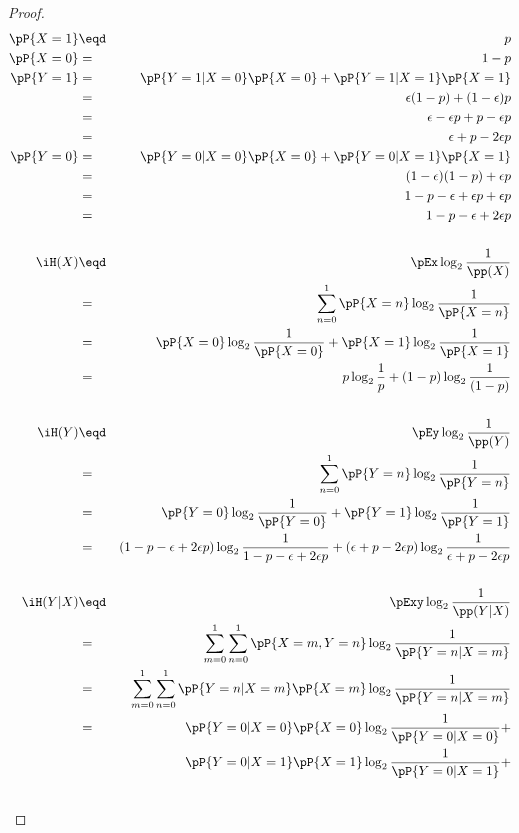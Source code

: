 \begin{proof}
\begin{eqnarray*}
  \pP{X=1} &\eqd& p    \\
  \pP{X=0} &=& 1-p     \\
  \pP{Y=1}
    &=& \pP{Y=1|X=0}\pP{X=0} + \pP{Y=1|X=1}\pP{X=1}
  \\&=& \epsilon(1-p) + (1-\epsilon)p
  \\&=& \epsilon-\epsilon p + p-\epsilon p
  \\&=& \epsilon+p-2\epsilon p
\\
  \pP{Y=0} 
    &=& \pP{Y=0|X=0}\pP{X=0} + \pP{Y=0|X=1}\pP{X=1}
  \\&=& (1-\epsilon )(1-p) + \epsilon p
  \\&=& 1-p-\epsilon +\epsilon p+\epsilon p
  \\&=& 1-p-\epsilon +2\epsilon p
\\
\\
  \iH(X)
    &\eqd& \pEx \log_2 \frac{1}{\pp(X)}
  \\&=&    \sum_{n=0}^1 \pP{X=n} \log_2 \frac{1}{\pP{X=n}}
  \\&=&    \pP{X=0} \log_2 \frac{1}{\pP{X=0}} +
           \pP{X=1} \log_2 \frac{1}{\pP{X=1}}
  \\&=&    p     \log_2 \frac{1}{p} +
           (1-p) \log_2 \frac{1}{(1-p)}
\\
\\
  \iH(Y)
    &\eqd& \pEy \log_2 \frac{1}{\pp(Y)}
  \\&=&    \sum_{n=0}^1 \pP{Y=n} \log_2 \frac{1}{\pP{Y=n}}
  \\&=&    \pP{Y=0} \log_2 \frac{1}{\pP{Y=0}} + 
           \pP{Y=1} \log_2 \frac{1}{\pP{Y=1}}
  \\&=&    (1-p-\epsilon +2\epsilon p) \log_2 \frac{1}{1-p-\epsilon +2\epsilon p} + 
           (\epsilon +p-2\epsilon p)   \log_2 \frac{1}{\epsilon +p-2\epsilon p}
\\
\\
  \iH(Y|X)
    &\eqd& \pExy \log_2 \frac{1}{\pp(Y|X)}
  \\&=&    \sum_{m=0}^1\sum_{n=0}^1 \pP{X=m,Y=n} \log_2 \frac{1}{\pP{Y=n|X=m}}
  \\&=&    \sum_{m=0}^1\sum_{n=0}^1 \pP{Y=n|X=m}\pP{X=m} 
           \log_2 \frac{1}{\pP{Y=n|X=m}}
  \\&=&    \pP{Y=0|X=0}\pP{X=0} \log_2 \frac{1}{\pP{Y=0|X=0}} + \\&&
           \pP{Y=0|X=1}\pP{X=1} \log_2 \frac{1}{\pP{Y=0|X=1}} + \\&&

\end{eqnarray*}
\end{proof}

